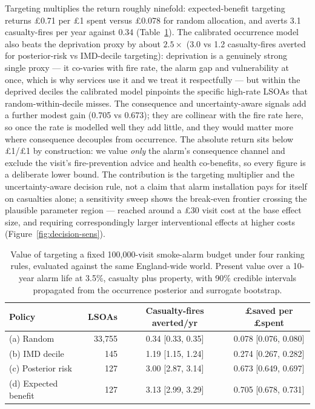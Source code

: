 Targeting multiplies the return roughly ninefold: expected-benefit targeting returns
\pounds0.71 per \pounds1 spent versus \pounds0.078 for random allocation, and averts
3.1 casualty-fires per year against 0.34 (Table~\ref{tab:decision}). The calibrated
occurrence model also beats the
deprivation proxy by about $2.5\times$ (3.0 vs 1.2 casualty-fires averted for
posterior-risk vs IMD-decile targeting): deprivation is a genuinely strong single
proxy --- it co-varies with fire rate, the alarm gap and vulnerability at once, which
is why services use it and we treat it respectfully --- but within the deprived
deciles the calibrated model pinpoints the specific high-rate LSOAs that
random-within-decile misses. The consequence and uncertainty-aware signals add a
further modest gain (0.705 vs 0.673); they are collinear with the fire rate here, so
once the rate is modelled well they add little, and they would matter more where
consequence decouples from occurrence. The absolute return sits below
\pounds1/\pounds1 by construction: we value \emph{only} the alarm's consequence
channel and exclude the visit's fire-prevention advice and health co-benefits, so
every figure is a deliberate lower bound. The contribution is the targeting
multiplier and the uncertainty-aware decision rule, not a claim that alarm
installation pays for itself on casualties alone; a sensitivity sweep shows the break-even frontier crossing the plausible
parameter region --- reached around a \pounds30 visit cost at the base effect
size, and requiring correspondingly larger interventional effects at higher
costs (Figure~\ref{fig:decision-sens}).

\begin{table}[htbp]
  \centering
  \caption{Value of targeting a fixed 100{,}000-visit smoke-alarm budget under four
  ranking rules, evaluated against the same England-wide world. Present value over a
  10-year alarm life at 3.5\%, casualty plus property, with 90\% credible intervals
  propagated from the occurrence posterior and surrogate bootstrap.}
  \label{tab:decision}
  \small
  \begin{tabular}{@{}lrcc@{}}
    \toprule
    Policy & LSOAs & Casualty-fires averted/yr & \pounds saved per \pounds spent \\
    \midrule
    (a) Random               & 33{,}755 & 0.34 [0.33, 0.35] & 0.078 [0.076, 0.080] \\
    (b) IMD decile           & 145      & 1.19 [1.15, 1.24] & 0.274 [0.267, 0.282] \\
    (c) Posterior risk       & 127      & 3.00 [2.87, 3.14] & 0.673 [0.649, 0.697] \\
    (d) Expected benefit     & 127      & 3.13 [2.99, 3.29] & 0.705 [0.678, 0.731] \\
    \bottomrule
  \end{tabular}
\end{table}



